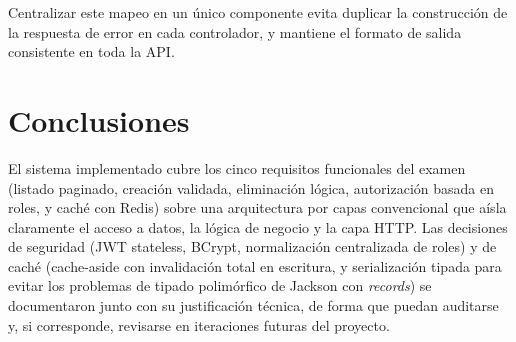 \documentclass[11pt,a4paper]{article}
\begin{document}
Centralizar este mapeo en un único componente evita duplicar la construcción
de la respuesta de error en cada controlador, y mantiene el formato de salida
consistente en toda la API.

\section{Conclusiones}

El sistema implementado cubre los cinco requisitos funcionales del examen
(listado paginado, creación validada, eliminación lógica, autorización basada
en roles, y caché con Redis) sobre una arquitectura por capas convencional que
aísla claramente el acceso a datos, la lógica de negocio y la capa HTTP. Las
decisiones de seguridad (JWT stateless, BCrypt, normalización centralizada de
roles) y de caché (cache-aside con invalidación total en escritura, y
serialización tipada para evitar los problemas de tipado polimórfico de
Jackson con \emph{records}) se documentaron junto con su justificación técnica,
de forma que puedan auditarse y, si corresponde, revisarse en iteraciones
futuras del proyecto.



\end{document}
